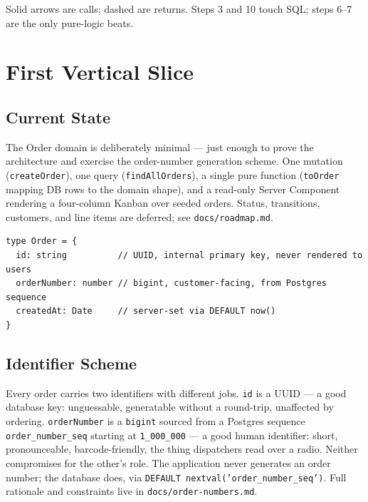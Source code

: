 \documentclass[11pt]{article}
\begin{document}
\begin{landscape}
\begin{center}
\end{center}

\noindent Solid arrows are calls; dashed are returns. Steps 3 and 10 touch SQL; steps 6--7 are the only pure-logic beats.
\end{landscape}

\section{First Vertical Slice}

\subsection{Current State}

The Order domain is deliberately minimal --- just enough to prove the architecture and exercise the order-number generation scheme. One mutation (\texttt{createOrder}), one query (\texttt{findAllOrders}), a single pure function (\texttt{toOrder} mapping DB rows to the domain shape), and a read-only Server Component rendering a four-column Kanban over seeded orders. Status, transitions, customers, and line items are deferred; see \texttt{docs/roadmap.md}.

\begin{lstlisting}[language={}]
type Order = {
  id: string          // UUID, internal primary key, never rendered to users
  orderNumber: number // bigint, customer-facing, from Postgres sequence
  createdAt: Date     // server-set via DEFAULT now()
}
\end{lstlisting}

\subsection{Identifier Scheme}

Every order carries two identifiers with different jobs. \texttt{id} is a UUID --- a good database key: unguessable, generatable without a round-trip, unaffected by ordering. \texttt{orderNumber} is a \texttt{bigint} sourced from a Postgres sequence \texttt{order\_number\_seq} starting at \texttt{1\_000\_000} --- a good human identifier: short, pronounceable, barcode-friendly, the thing dispatchers read over a radio. Neither compromises for the other's role. The application never generates an order number; the database does, via \texttt{DEFAULT nextval('order\_number\_seq')}. Full rationale and constraints live in \texttt{docs/order-numbers.md}.
\end{document}
